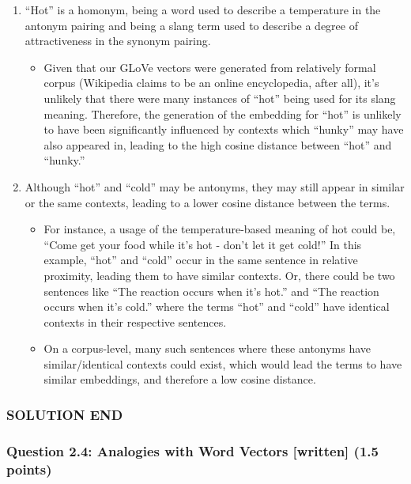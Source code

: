 \documentclass[11pt]{article}
\providecommand{\tightlist}{%
      \setlength{\itemsep}{0pt}\setlength{\parskip}{0pt}}
\begin{document}
\begin{enumerate}
\def\labelenumi{\arabic{enumi}.}
\tightlist
\item
  ``Hot'' is a homonym, being a word used to describe a temperature in
  the antonym pairing and being a slang term used to describe a degree
  of attractiveness in the synonym pairing.

  \begin{itemize}
  \tightlist
  \item
    Given that our GLoVe vectors were generated from relatively formal
    corpus (Wikipedia claims to be an online encyclopedia, after all),
    it's unlikely that there were many instances of ``hot'' being used
    for its slang meaning. Therefore, the generation of the embedding
    for ``hot'' is unlikely to have been significantly influenced by
    contexts which ``hunky'' may have also appeared in, leading to the
    high cosine distance between ``hot'' and ``hunky.''
  \end{itemize}
\item
  Although ``hot'' and ``cold'' may be antonyms, they may still appear
  in similar or the same contexts, leading to a lower cosine distance
  between the terms.

  \begin{itemize}
  \tightlist
  \item
    For instance, a usage of the temperature-based meaning of hot could
    be, ``Come get your food while it's hot - don't let it get cold!''
    In this example, ``hot'' and ``cold'' occur in the same sentence in
    relative proximity, leading them to have similar contexts. Or, there
    could be two sentences like ``The reaction occurs when it's hot.''
    and ``The reaction occurs when it's cold.'' where the terms ``hot''
    and ``cold'' have identical contexts in their respective sentences.
  \item
    On a corpus-level, many such sentences where these antonyms have
    similar/identical contexts could exist, which would lead the terms
    to have similar embeddings, and therefore a low cosine distance.
  \end{itemize}
\end{enumerate}

\hypertarget{solution-end}{%
\subsubsection{SOLUTION END}\label{solution-end}}

    \hypertarget{question-2.4-analogies-with-word-vectors-written-1.5-points}{%
\subsubsection{Question 2.4: Analogies with Word Vectors {[}written{]}
(1.5
points)}\label{question-2.4-analogies-with-word-vectors-written-1.5-points}}
\end{document}
